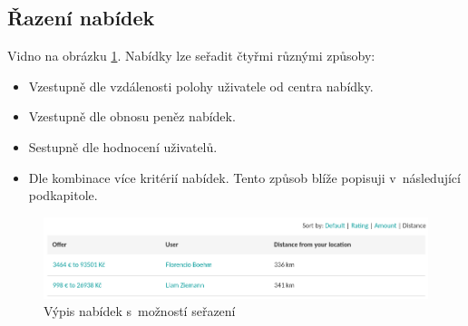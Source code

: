 \subsection{Řazení nabídek}
Vidno na obrázku \ref{fig:tur:sorting}. Nabídky lze seřadit čtyřmi různými způsoby:
\begin{itemize}
	\item Vzestupně dle vzdálenosti polohy uživatele od centra nabídky.
	\item Vzestupně dle obnosu peněz nabídek.
	\item Sestupně dle hodnocení uživatelů.
	\item Dle kombinace více kritérií nabídek. Tento způsob blíže popisuji v~následující podkapitole.
\end{itemize}

\begin{figure}[!h]
    \centering
    \includegraphics[width=1.0\textwidth]{media/tur/sorting.png}
    \caption{Výpis nabídek s~možností seřazení}
    \label{fig:tur:sorting}
\end{figure}


